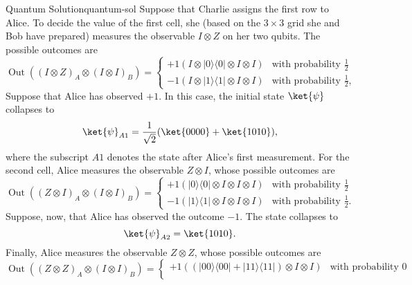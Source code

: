 \documentclass{llncs}
\newcommand{\ketbra}[2]{\ensuremath{| #1 \rangle \langle #2 |}}
\begin{document}
\begin{tcbexample}{Quantum Solution}{quantum-sol}
  Suppose that Charlie assigns the first row to Alice. To decide the
  value of the first cell, she (based on the \(3 \times 3\) grid she
  and Bob have prepared) measures the observable \(I \otimes Z\)
  on her two qubits. The possible outcomes are
  \begin{equation}
    \operatorname{Out}((I \otimes Z)_{A} \otimes (I \otimes I)_{B}) =
    \begin{cases}
      +1 \left(I \otimes \ketbra{0}{0} \otimes I \otimes I\right)
        &\text{with probability } \frac{1}{2} \\
      -1 \left(I \otimes \ketbra{1}{1} \otimes I \otimes I\right)
        &\text{with probability } \frac{1}{2},
    \end{cases}
  \end{equation}
  Suppose that Alice has observed \(+1\). In this case, the initial
  state \(\ket{\psi}\) collapses to
  \begin{equation}
    \ket{\psi}_{A1} =  \frac{1}{\sqrt{2}}(\ket{0000} + \ket{1010}),
  \end{equation}
  where the subscript \(A1\) denotes the state after Alice's first
  measurement.  For the second cell, Alice measures the observable
  \(Z \otimes I\), whose possible outcomes are
  \begin{equation}
    \operatorname{Out}((Z \otimes I)_{A} \otimes (I \otimes I)_{B}) =
    \begin{cases}
      +1 \left(\ketbra{0}{0} \otimes I \otimes I \otimes I\right)
        &\text{with probability } \frac{1}{2} \\
      -1 \left(\ketbra{1}{1} \otimes I \otimes I \otimes I\right)
        &\text{with probability } \frac{1}{2}.
    \end{cases}
  \end{equation}
  Suppose, now, that Alice has observed the outcome \(-1\). The state
  collapses to
  \begin{equation}
    \ket{\psi}_{A2} =  \ket{1010}.
  \end{equation}
  Finally, Alice measures the observable \(Z \otimes Z\), whose
  possible outcomes are
  \begin{equation}
    \operatorname{Out}((Z \otimes Z)_{A} \otimes (I \otimes I)_{B}) =
    \begin{cases}
      +1 \left(\left(\ketbra{00}{00} + \ketbra{11}{11}\right) \otimes I \otimes I\right)
      &\text{with probability } 0 \\

\end{cases}
\end{equation}
\end{tcbexample}
\end{document}
